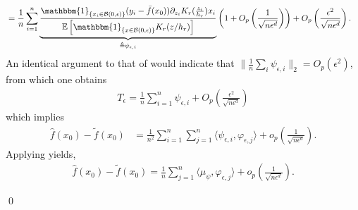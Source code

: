 \documentclass[11pt]{article}
\begin{document}
\begin{appendices}
\begin{align*}
    &= \frac{1}{n}\sum_{i = 1}^n\underbrace{\frac{\mathbbm{1}_{\{x_i \in \mathcal{B}(0, \epsilon)\}}(y_i - \bar{f}(x_0))\partial_{z_i}K_r(\frac{z_i}{h_r})x_i}{\mathbb{E}\left[\mathbbm{1}_{\{x \in \mathcal{B}(0, \epsilon)\}}K_r(z/h_r)\right]}}_{\triangleq \psi_{\epsilon, i}}\left(1 + O_p\left(\frac{1}{\sqrt{n\epsilon^d}}\right)\right) + O_p\left(\frac{\epsilon^2}{\sqrt{n\epsilon^d}}\right).
\end{align*}
An identical argument to that of  would indicate that $\|\frac{1}{n}\sum_i\psi_{\epsilon, i}\|_2 = O_p(\epsilon^2)$, from which one obtains
\begin{align*}
    T_{\epsilon} = \frac{1}{n}\sum_{i = 1}^n\psi_{\epsilon, i} + O_p\left(\frac{\epsilon^2}{\sqrt{n\epsilon^d}}\right)
\end{align*}
which implies
\begin{align*}
    \hat{f}(x_0) - \tilde{f}(x_0) &= \frac{1}{n^2}\sum_{i = 1}^n\sum_{j = 1}^n\langle \psi_{\epsilon, i}, \varphi_{\epsilon,j }\rangle + o_p\left(\frac{1}{\sqrt{n\epsilon^{d}}} \right).
\end{align*}
Applying  yields,
\begin{align*}
    \hat{f}(x_0) - \tilde{f}(x_0) = \frac{1}{n}\sum_{j = 1}^n\langle\mu_{\psi}, \varphi_{\epsilon, j}\rangle + o_p\left(\frac{1}{\sqrt{n\epsilon^d}}\right).
\end{align*}

\qed{}




\end{appendices}
\end{document}
